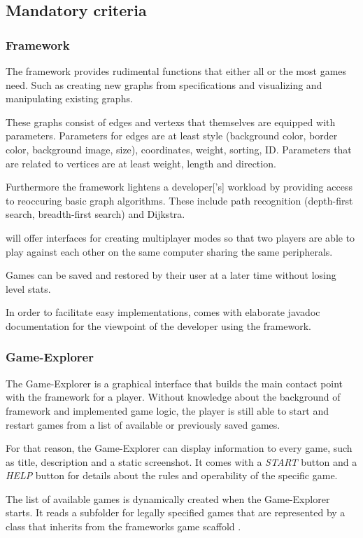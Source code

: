 \subsection{Mandatory criteria}
\subsubsection{Framework}
The framework provides rudimental functions that either all or the most games need. Such as creating new graphs from specifications and visualizing and manipulating existing graphs.\par
These graphs consist of \glspl{edge} and \glspl{vertex} that themselves are equipped with parameters. Parameters for edges are at least style (background color, border color, background image, size), coordinates, weight, sorting, \gls{ID}. Parameters that are related to vertices are at least weight, length and direction.\par
Furthermore the framework lightens a \gls{developer}['s] workload by providing access to reoccuring basic graph algorithms. These include path recognition (depth-first search, breadth-first search) and Dijkstra.\par {}
\graphioli will offer interfaces for creating multiplayer modes so that two \glspl{player} are able to play against each other on the same computer sharing the same peripherals.\par
Games can be saved and restored by their user at a later time without losing \gls{level} stats.\par
In order to facilitate easy implementations, \graphioli comes with elaborate \Gls{javadoc} documentation for the viewpoint of the developer using the framework.\par {}

\subsubsection{Game-Explorer}
The Game-Explorer is a graphical interface that builds the main contact point with the framework for a player. Without knowledge about the background of framework and implemented game logic, the player is still able to start and restart games from a list of available or previously saved games.\par
For that reason, the Game-Explorer can display information to every game, such as title, description and a static screenshot. It comes with a \emph{START} button  and a \emph{HELP} button for details about the rules and operability of the specific game.\par
The list of available games is dynamically created when the Game-Explorer starts. It reads a subfolder for legally specified games that are represented by a class that inherits from the frameworks game scaffold .

